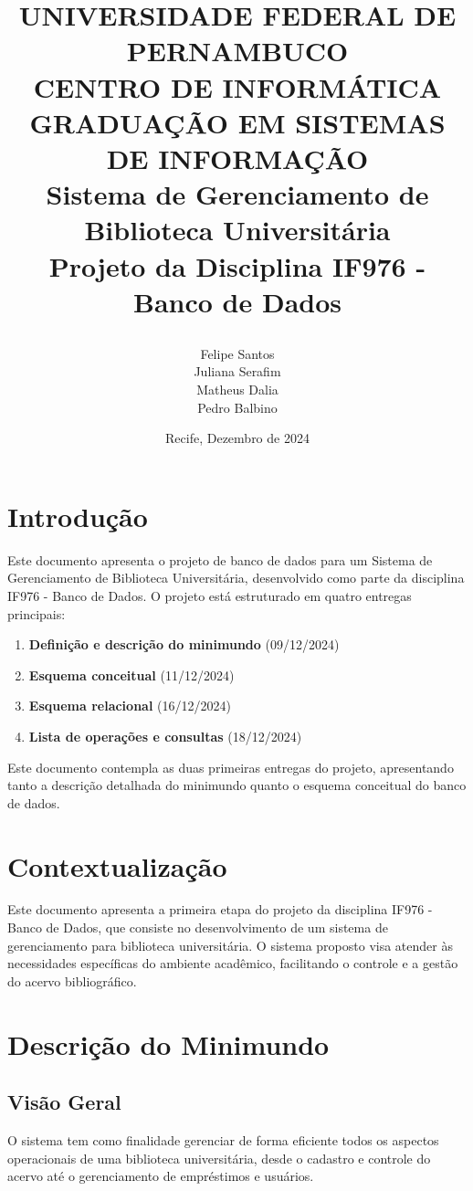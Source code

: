 \documentclass[12pt,a4paper]{article}
\title{
    \vspace{-1.5cm}
    \begin{center}
        \large{UNIVERSIDADE FEDERAL DE PERNAMBUCO}\\
        \large{CENTRO DE INFORMÁTICA}\\
        \large{GRADUAÇÃO EM SISTEMAS DE INFORMAÇÃO}\\[2cm]
        \huge{\textbf{Sistema de Gerenciamento de Biblioteca Universitária}}\\[0.5cm]
        \large{Projeto da Disciplina IF976 - Banco de Dados}\\[4cm]
    \end{center}
}
\author{
    \begin{tabular}{c}
        Felipe Santos\\
        Juliana Serafim\\
        Matheus Dalia\\
        Pedro Balbino
    \end{tabular}
}
\date{Recife, Dezembro de 2024}
\begin{document}
\maketitle
\thispagestyle{empty}

\newpage
\tableofcontents
\thispagestyle{empty}
\newpage

\section{Introdução}
Este documento apresenta o projeto de banco de dados para um Sistema de Gerenciamento de Biblioteca Universitária, desenvolvido como parte da disciplina IF976 - Banco de Dados. O projeto está estruturado em quatro entregas principais:

\begin{enumerate}
    \item \textbf{Definição e descrição do minimundo} (09/12/2024)
    \item \textbf{Esquema conceitual} (11/12/2024)
    \item \textbf{Esquema relacional} (16/12/2024)
    \item \textbf{Lista de operações e consultas} (18/12/2024)
\end{enumerate}

Este documento contempla as duas primeiras entregas do projeto, apresentando tanto a descrição detalhada do minimundo quanto o esquema conceitual do banco de dados.



\section{Contextualização}
Este documento apresenta a primeira etapa do projeto da disciplina IF976 - Banco de Dados, que consiste no desenvolvimento de um sistema de gerenciamento para biblioteca universitária. O sistema proposto visa atender às necessidades específicas do ambiente acadêmico, facilitando o controle e a gestão do acervo bibliográfico.



\section{Descrição do Minimundo}

\subsection{Visão Geral}
\begin{tcolorbox}[title=Objetivo do Sistema]
O sistema tem como finalidade gerenciar de forma eficiente todos os aspectos operacionais de uma biblioteca universitária, desde o cadastro e controle do acervo até o gerenciamento de empréstimos e usuários.
\end{tcolorbox}
\end{document}
